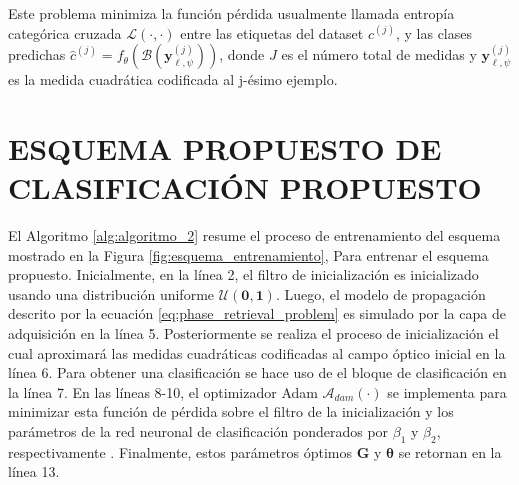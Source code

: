 Este problema minimiza la función pérdida usualmente llamada entropía categórica cruzada $\mathcal{L}(\cdot, \cdot)$ entre las etiquetas del dataset $c^{(j)}$, y las clases predichas $\hat{c}^{(j)} = f_\theta(\mathcal{B}(\mathbf{y}_{\ell, \psi}^{(j)}))$, donde $J$ es el número total de medidas y $\mathbf{y}_{\ell, \psi}^{(j)}$ es la medida cuadrática codificada al  j-ésimo ejemplo.


\section{ESQUEMA PROPUESTO DE CLASIFICACIÓN PROPUESTO}

El Algoritmo \ref{alg:algoritmo_2} resume el proceso de entrenamiento del esquema mostrado en la Figura \ref{fig:esquema_entrenamiento},  Para entrenar el esquema propuesto. Inicialmente, en la línea 2, el filtro de inicialización es inicializado usando una distribución uniforme $\mathcal{U}(\mathbf{0},\mathbf{1})$. Luego, el modelo de propagación descrito por la ecuación \eqref{eq:phase_retrieval_problem} es simulado por la capa de adquisición en la línea 5. Posteriormente se realiza el proceso de inicialización el cual aproximará las medidas cuadráticas codificadas al campo óptico inicial en la línea 6. Para obtener una clasificación se hace uso de el bloque de clasificación en la línea 7. En las líneas 8-10, el optimizador Adam $\mathcal{A}_{dam}(\cdot)$ se implementa para minimizar esta función de pérdida sobre el filtro de la inicialización y los parámetros de la red neuronal de clasificación ponderados por $\beta_1$ y $\beta_2$, respectivamente . Finalmente, estos parámetros óptimos $\mathbf{G}$ y $\boldsymbol{\theta}$ se retornan en la línea 13.



